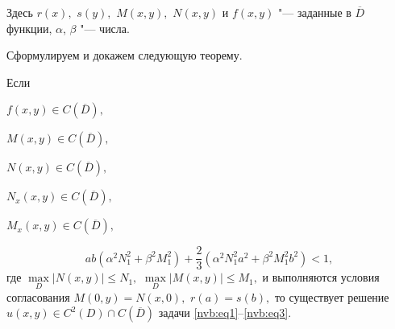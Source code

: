 Здесь $r(x),$ $s(y),$ $M(x,y),$ $N(x,y)$ и $f(x,y)$ "--- заданные в $\overline{D}$ функции, $\alpha$, $\beta$ "--- числа.



\smallskip



 Сформулируем и докажем следующую теорему.



\begin{theorem}

Если 

$f(x,y)\in C(\overline{D}),$ 

$M(x,y)\in C(\overline{D}),$ 

$N(x,y)\in C(\overline{D}),$ 

$N_x(x,y)\in C(\overline{D}),$ 

$M_x(x,y)\in C(\overline{D}),$ 

$$\textstyle ab(\alpha^2N^2_1+\beta^2M^2_1)+\frac{2}{3}(\alpha^2N^2_1a^2+\beta^2M^2_1b^2)<1,$$ где $\max\limits_D |N(x,y)|\leq N_1,$ $\max\limits_D |M(x,y)|\leq M_1,$ и выполняются условия согласования $M(0,y)=N(x,0),$ $r(a)=s(b),$ то существует решение $u(x,y)\in C^2(D)\cap C(\overline{D})$ задачи \eqref{nvb:eq1}--\eqref{nvb:eq3}.

\end{theorem}

